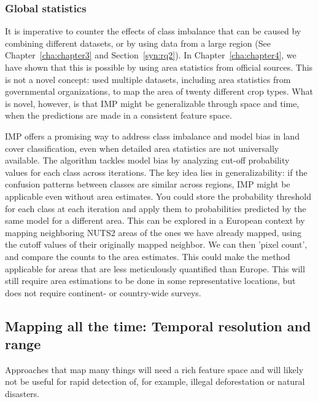         \subsubsection{Global statistics}

        It is imperative to counter the effects of class imbalance that can be caused by combining different datasets, or by using data from a large region (See Chapter\@~\ref{cha:chapter3} and Section\@~\ref{syn:rq2}). In Chapter\@~\ref{cha:chapter4}, we have shown that this is possible by using area statistics from official sources. This is not a novel concept: \citet{you2014generating} used multiple datasets, including area statistics from governmental organizations, to map the area of twenty different crop types. What is novel, however, is that IMP might be generalizable through space and time, when the predictions are made in a consistent feature space.

        IMP offers a promising way to address class imbalance and model bias in land cover classification, even when detailed area statistics are not universally available. The algorithm tackles model bias by analyzing cut-off probability values for each class across iterations. The key idea lies in generalizability: if the confusion patterns between classes are similar across regions, IMP might be applicable even without area estimates. You could store the probability threshold for each class at each iteration and apply them to probabilities predicted by the same model for a different area. This can be explored in a European context by mapping neighboring NUTS2 areas of the ones we have already mapped, using the cutoff values of their originally mapped neighbor. We can then 'pixel count', and compare the counts to the area estimates. This could make the method applicable for areas that are less meticulously quantified than Europe. This will still require area estimations to be done in some representative locations, but does not require continent- or country-wide surveys. 
        
    \subsection{Mapping all the time: Temporal resolution and range}
        \label{syn:allthetime}

        Approaches that map many things will need a rich feature space and will likely not be useful for rapid detection of, for example, illegal deforestation or natural disasters. 

